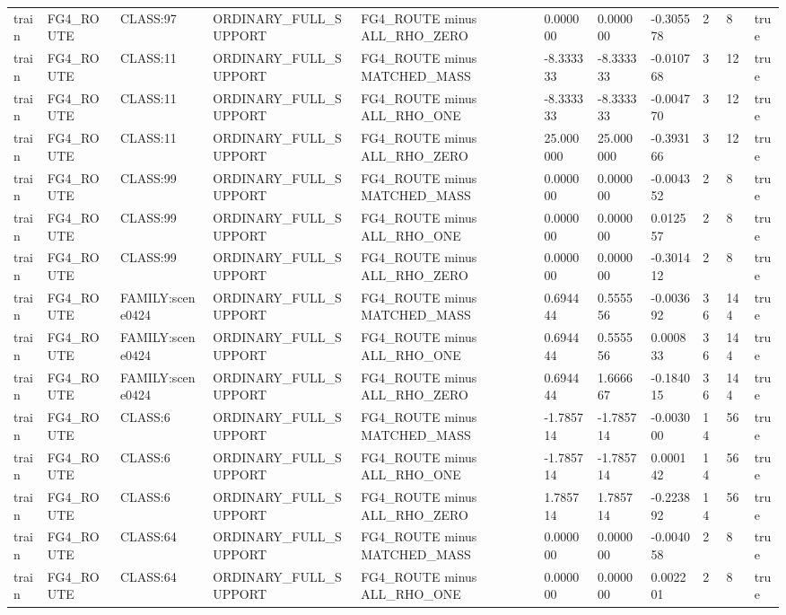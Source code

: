 \begin{tabular}{lllllllllll}
train & FG4\_ROUTE & CLASS:97 & ORDINARY\_FULL\_SUPPORT & FG4\_ROUTE minus ALL\_RHO\_ZERO & 0.000000 & 0.000000 & -0.305578 & 2 & 8 & true \\
train & FG4\_ROUTE & CLASS:11 & ORDINARY\_FULL\_SUPPORT & FG4\_ROUTE minus MATCHED\_MASS & -8.333333 & -8.333333 & -0.010768 & 3 & 12 & true \\
train & FG4\_ROUTE & CLASS:11 & ORDINARY\_FULL\_SUPPORT & FG4\_ROUTE minus ALL\_RHO\_ONE & -8.333333 & -8.333333 & -0.004770 & 3 & 12 & true \\
train & FG4\_ROUTE & CLASS:11 & ORDINARY\_FULL\_SUPPORT & FG4\_ROUTE minus ALL\_RHO\_ZERO & 25.000000 & 25.000000 & -0.393166 & 3 & 12 & true \\
train & FG4\_ROUTE & CLASS:99 & ORDINARY\_FULL\_SUPPORT & FG4\_ROUTE minus MATCHED\_MASS & 0.000000 & 0.000000 & -0.004352 & 2 & 8 & true \\
train & FG4\_ROUTE & CLASS:99 & ORDINARY\_FULL\_SUPPORT & FG4\_ROUTE minus ALL\_RHO\_ONE & 0.000000 & 0.000000 & 0.012557 & 2 & 8 & true \\
train & FG4\_ROUTE & CLASS:99 & ORDINARY\_FULL\_SUPPORT & FG4\_ROUTE minus ALL\_RHO\_ZERO & 0.000000 & 0.000000 & -0.301412 & 2 & 8 & true \\
train & FG4\_ROUTE & FAMILY:scene0424 & ORDINARY\_FULL\_SUPPORT & FG4\_ROUTE minus MATCHED\_MASS & 0.694444 & 0.555556 & -0.003692 & 36 & 144 & true \\
train & FG4\_ROUTE & FAMILY:scene0424 & ORDINARY\_FULL\_SUPPORT & FG4\_ROUTE minus ALL\_RHO\_ONE & 0.694444 & 0.555556 & 0.000833 & 36 & 144 & true \\
train & FG4\_ROUTE & FAMILY:scene0424 & ORDINARY\_FULL\_SUPPORT & FG4\_ROUTE minus ALL\_RHO\_ZERO & 0.694444 & 1.666667 & -0.184015 & 36 & 144 & true \\
train & FG4\_ROUTE & CLASS:6 & ORDINARY\_FULL\_SUPPORT & FG4\_ROUTE minus MATCHED\_MASS & -1.785714 & -1.785714 & -0.003000 & 14 & 56 & true \\
train & FG4\_ROUTE & CLASS:6 & ORDINARY\_FULL\_SUPPORT & FG4\_ROUTE minus ALL\_RHO\_ONE & -1.785714 & -1.785714 & 0.000142 & 14 & 56 & true \\
train & FG4\_ROUTE & CLASS:6 & ORDINARY\_FULL\_SUPPORT & FG4\_ROUTE minus ALL\_RHO\_ZERO & 1.785714 & 1.785714 & -0.223892 & 14 & 56 & true \\
train & FG4\_ROUTE & CLASS:64 & ORDINARY\_FULL\_SUPPORT & FG4\_ROUTE minus MATCHED\_MASS & 0.000000 & 0.000000 & -0.004058 & 2 & 8 & true \\
train & FG4\_ROUTE & CLASS:64 & ORDINARY\_FULL\_SUPPORT & FG4\_ROUTE minus ALL\_RHO\_ONE & 0.000000 & 0.000000 & 0.002201 & 2 & 8 & true \\

\end{tabular}
